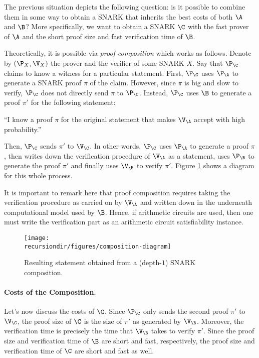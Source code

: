 The previous situation depicts the following question: is it possible to combine them in some way to obtain a SNARK that inherits the best costs of both $\A$ and $\B$? More specifically, we want to obtain a SNARK $\C$ with the fast prover of $\A$ and the short proof size and fast verification time of $\B$.

Theoretically, it is possible via \textit{proof composition} which works as follows. Denote by $(\P_X, \V_X)$ the prover and the verifier of some SNARK $X$.  Say that $\P_{\C}$ claims to know a witness for a particular statement. First, $\P_{\C}$ uses $\P_{\A}$ to generate a SNARK proof $\pi$ of the claim. However, since $\pi$ is big and slow to verify, $\P_{\C}$ does not directly send $\pi$ to $\P_{\C}$. Instead, $\P_{\C}$ uses $\B$ to generate a proof $\pi'$ for the following statement:
\begin{center}
	``I know a proof $\pi$ for the original statement that makes $\V_{\A}$ accept with high probability.''
\end{center}
Then, $\P_{\C}$ sends $\pi'$ to $\V_{\C}$. In other words, $\P_{\C}$ uses $\P_{\A}$ to generate a proof $\pi$, then writes down the verification procedure of $\V_{\A}$ as a statement, uses $\P_{\B}$ to generate the proof $\pi'$ and finally uses $\V_{\B}$ to verify $\pi'$. Figure \ref{fig:composition} shows a diagram for this whole process.

It is important to remark here that proof composition requires taking the verification procedure as carried on by $\V_{\A}$ and written down in the underneath computational model used by $\B$. Hence, if arithmetic circuits are used, then one must write the verification part as an arithmetic circuit satisfiability instance.

\begin{figure}[H]
	\centering
	\texttt{[image: \\recursiondir/figures/composition-diagram]}
	\caption{Resulting statement obtained from a (depth-$1$) SNARK composition.}
	\label{fig:composition}
\end{figure}

\paragraph*{Costs of the Composition.}
Let's now discuss the costs of $\C$. Since $\P_{\C}$ only sends the second proof $\pi'$ to $\V_{\C}$, the proof size of $\C$ is the size of $\pi'$ as generated by $\V_{\B}$. Moreover, the verification time is precisely the time that $\V_{\B}$ takes to verify $\pi'$. Since the proof size and verification time of $\B$ are short and fast, respectively, the proof size and verification time of $\C$ are short and fast as well.

